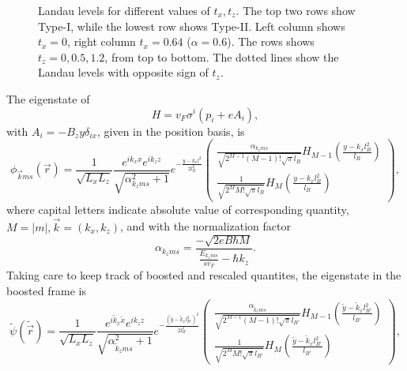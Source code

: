 \begin{figure}[p!]
  \centering
  
  \caption{\label{fig:llevelstilt}Landau levels for different values of \( t_x, t_z \).
    The top two rows show Type-I, while the lowest row shows Type-II.
    Left column shows \( t_x = 0 \), right column \( t_x = 0.64 \) (\( \alpha = 0.6 \)).
    The rows shows \( t_z = 0, 0.5, 1.2 \), from top to bottom.
    The dotted lines show the Landau levels with opposite sign of \( t_z \).
  }
\end{figure}

The eigenstate of
\[
H = v_{F} \sigma ^{i} ( p_{i} + e A_{i} ),
\]
with \(A_{i} = - B_{z} y \delta _{i x}\), given in the position basis, is
\begin{equation}
  \phi _{\vec{k} m s}(\vec{r}) = \frac{1}{\sqrt{L_xL_z}}
  \frac{e^{ik_x x}e^{ik_z z}}{\sqrt{\alpha_{k_z m s}^2 + 1}}
  e^{-\frac{y-k_x l^2}{2 l_B^2}}
  \begin{pmatrix}
    \frac{\alpha_{k_z m s}}{\sqrt{2^{M-1} (M-1)! \sqrt{\pi } l_B}} H_{M-1}\left( \frac{y-k_x l_B^2}{l_B} \right)\\
    \frac{1}{\sqrt{2^M M! \sqrt{\pi } l_B}} H_M \left( \frac{y-k_x l_B^2}{l_B} \right)
  \end{pmatrix},
\end{equation}
where capital letters indicate absolute value of corresponding quantity, $M=|m|, \vec{k} = (k_x, k_z)$, and with the normalization factor
\begin{equation}
  \alpha_{k_z m s} = \frac{-\sqrt{2eB\hbar M}}{\frac{E_{k_z m s}}{s v_{F}} - \hbar  k_z}.
\end{equation}
Taking care to keep track of boosted and rescaled quantites, the eigenstate in the boosted frame is
\begin{equation}
  \label{eq:47}
  \tilde{\psi}(\tilde{\vec{r}}) =
  \frac{1}{\sqrt{L_xL_z}}
  \frac{e^{i \tilde{k}_x \tilde{x}}e^{i k_z z}}{\sqrt{\alpha_{\tilde{k}_z m s}^2 + 1}}
  e^{-\frac{\left(\tilde{y} - \tilde{k}_x l_{B'}^2\right)^2}{2 l_{B'}^2}}
  \begin{pmatrix}
    \frac{\alpha_{\tilde{k}_z m s}}{\sqrt{2^{M-1} (M-1)! \sqrt{\pi } l_{B'}}} H_{M-1}\left( \frac{\tilde{y} - \tilde{k}_x l_{B'}^2}{l_{B'}} \right)\\
    \frac{1}{\sqrt{2^M M! \sqrt{\pi } l_{B'}}} H_M \left( \frac{\tilde{y} - \tilde{k}_x l_{B'}^2}{l_{B'}} \right)
  \end{pmatrix},
\end{equation}
